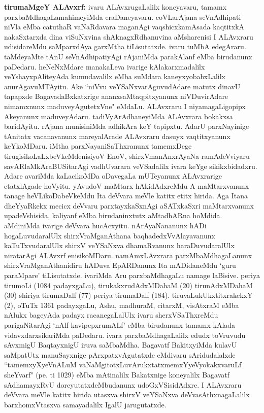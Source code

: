 {\large\textbf{tirumaMgeY ALAvxrf:}} ivaru ALAvxrugaLalilx koneyavaru, tamamx parxbaMdhagaLa\break mahimeyiMda eraDaneyavaru. coVLarAjana seVnAdhipati niVla eMba catuthaR vaNaRdavara maganAgi vaqshicxkamAsada kaqtitxkA nakaSxtarxda dina viSuNxvina shAknagxRdhanuvina aMsharenisi I ALAvxraru udisidareMdu saMparxdAya garxMtha tiLisutatxde. ivaru tuMbA edegAraru. taMdeyaMte tAnU seVnAdhipatiyAgi rAjaniMda parakAlanf eMba birudanunx paDedaru. heNeNxMdare manakaLeva ivarige kAlakarxmadalilx veYshayxpAliteyAda kumudavalilx eMba suMdara kaneyxyobabxLalilx anurAgavuMTAyitu. Ake ``niVvu veYSaNxva\-rAguvudAdare matutx dinavU tapapxde BagavadaBxkatxrige ananxsaMtaqpitxyanunx niVDuvirAdare nimamxnunx maduveyAgutetxVne" eMdaLu. ALAvxraru I niyamagaLigopipx Akeyanunx maduveyAdaru. tadiVyArAdhaneyiMda ALAvxrara bokakxsa baridAyitu. rAjana munisiniMda adhikAra keY tapipxtu. AdarU parxNayinige tAnitatx vacanavanunx mareyalArade ALAvxraru dasuyx vaqtitxyanunx keYkoMDaru. iMtha parxNayaniSaThxranunx tamemxDege tirugisikoLaLxbeVkeMdenisiyoV EnoV, shirxVmanAnxrAyaNa ramAdeVviyaru savARlaMkAraBUSitarAgi vadhUvarara veVSadalilx ivara keYge sikikxbidadxru. Adare avariMda kaLacikoMDa oDavegaLa mUTeyanunx ALAvxrarige etatxlAgade hoVyitu. yAvudoV maMtarx hAkidAdxreMdu A maMtarxvanunx tanage heVLikoDabeVkeMdu Ita deVvara meVle katitx etitx hirida. Aga Itana dheYyaRkekx mecicx deVvaru parxtayxkaSxnAgi aSATxkaSxri maMtarxvanunx upadeVshisida, kaliyanf eMba birudaninxtutx aMtadhARna hoMdida. aMdiniMda ivarige deVvara hucAcxyitu. nArAyaNananunx hADi hogaLuvudaralUlx shirxVraMganAthana baqhadedxVvAlayavanunx kaTuTxvudaralUlx shirxV veYSaNxva dhamaRvanunx haraDuvudaralUlx niratarAgi ALAvxrf enisikoMDaru. namAmxLAvxrara parxMbaMdhagaLanunx shirxVraMganAthanidiru hADuva EpARDanunx Ita mADidaneMdu `guru paraMpare' tiLisutatxde. ivariMda Aru parxbaMdhagaLu namage laBisive. periya tirumoLi (1084 padayxgaLu), tirukakxrudAdxMDahaM (20) tirunAdxMDahaM (30) shiriya tirumaDalf (77) periya tirumaDalf (184). tiruvaLukUkxtitxrakekxY (2), oTuTx 1361 padayxgaLu, Ashu, madhuraM, citarxM, visAtxraM eMba nAlukx bageyAda padayx racanegaLalUlx ivaru sherxVSaThxreMdu parigaNitarAgi `nAlf kavipepxrumALf' eMba birudanunx tamamx kAlada vidavxdarxsikariMda paDedaru. ivara parxbaMdhagaLalilx edudx toVruvudu sAvxmigU BaqtayxnigU iruva saMbaMdha. Bagavatf BakitxyiMda kulavU saMpatUtx manuSayxnige pArxpatxvAgutatxde eMdivaru sAridudalalxde ``tamemxyXyeVnALuM vaNaMgitotxLuvArukxtatxmemxYyeVyokakxvaruLf sheYvarf" (pe. ti 1029) eMba mAtinalilx Bakatxnige koneyalilx Bagavatf sAdhamayxRvU doreyutatxdeMbudanunx udoGxVSisidAdxre. I ALAvxraru deVvara meVle katitx hirida utasxva shirxV veYSaNxva deVvasAthxnagaLalilx barxhomxVtasxva samayadalilx IgalU jarugutatxde.

